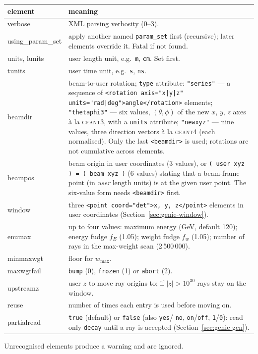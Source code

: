 \documentclass[11pt]{article}
\newcommand{\code}[1]{\texttt{#1}}
\newcommand{\geant}{\textsc{geant}\xspace}
\newcommand{\sect}[1]{Section~\ref{sec:#1}}
\begin{document}
\begin{center}\small
\begin{longtable}{>{\ttfamily}p{} p{}}
\toprule
\textrm{\textbf{element}} & \textbf{meaning} \\ \midrule
\endhead
verbose & XML parsing verbosity (0--3). \\
using\_param\_set & apply another named \code{param\_set} first (recursive);
   later elements override it.  Fatal if not found. \\
units, lunits & user length unit, e.g.\ \code{m}, \code{cm}.  Set first. \\
tunits & user time unit, e.g.\ \code{s}, \code{ns}. \\
beamdir & beam-to-user rotation; \code{type} attribute:
   \code{"series"} --- a sequence of \code{<rotation axis="x|y|z"
   units="rad|deg">angle</rotation>} elements;
   \code{"thetaphi3"} --- six values, $(\theta,\phi)$ of the new $x$, $y$,
   $z$ axes \`a la \geant{}3, with a \code{units} attribute;
   \code{"newxyz"} --- nine values, three direction vectors \`a la
   \geant{}4 (each normalised).  Only the last \code{<beamdir>} is used;
   rotations are not cumulative across elements. \\
beampos & beam origin in user coordinates (3 values), or
   \code{( user xyz ) = ( beam xyz )} (6 values) stating that a beam-frame
   point (in \emph{user} length units) is at the given user point.  The
   six-value form needs \code{<beamdir>} first. \\
window & three \code{<point coord="det">x, y, z</point>} elements in user
   coordinates (\sect{genie-window}). \\
enumax & up to four values: maximum energy (GeV, default 120); energy
   fudge $f_E$ (1.05); weight fudge $f_w$ (1.05); number of rays in the
   max-weight scan (2\,500\,000). \\
minmaxwgt & floor for $w_\mathrm{max}$. \\
maxwgtfail & \code{bump} (0), \code{frozen} (1) or \code{abort} (2). \\
upstreamz & user $z$ to move ray origins to; if $|z| > 10^{30}$ rays stay
   on the window. \\
reuse & number of times each entry is used before moving on. \\
partialread & \code{true} (default) or \code{false} (also \code{yes}/%
   \code{no}, \code{on}/\code{off}, \code{1}/\code{0}): read only
   \code{decay} until a ray is accepted (\sect{genie-gen}). \\
\bottomrule
\end{longtable}
\end{center}
Unrecognised elements produce a warning and are ignored.
\end{document}
